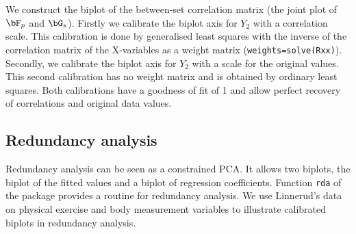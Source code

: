 \documentclass[a4paper]{article}
\begin{document}
We construct the biplot of the between-set correlation matrix (the joint 
plot of ${\bF}_p$ and ${\bG}_s$). 
Firstly we calibrate the biplot axis for $Y_2$ with a correlation scale.
This calibration is done by generalised least squares with the inverse of the correlation matrix of 
the X-variables as a weight matrix ({\tt weights=solve(Rxx)}). Secondly, we calibrate the biplot axis 
for $Y_2$ with a scale for the original values. This second calibration has no weight 
matrix and is obtained by ordinary least squares. Both calibrations have a goodness of fit of 1 and
allow perfect recovery of correlations and original data values.

\subsection{Redundancy analysis}
\label{sec:rda}

Redundancy analysis can be seen as a constrained PCA. It allows two biplots, the biplot of the fitted
values and a biplot of regression coefficients. Function {\tt rda} of the package provides a routine
for redundancy analysis. We use Linnerud's data on physical exercise and body measurement variables
to illustrate calibrated biplots in redundancy analysis.
\end{document}
